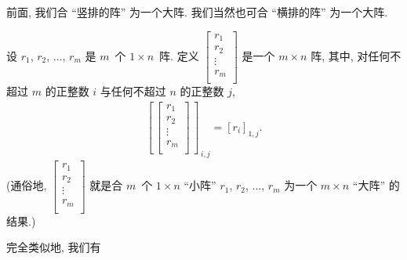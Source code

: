 前面, 我们合 ``竖排的阵'' 为一个大阵.
我们当然也可合 ``横排的阵'' 为一个大阵.

\begin{definition}
    设 \(r_1\), \(r_2\), \(\dots\), \(r_m\)
    是 \(m\)~个 \(1 \times n\)~阵.
    定义
    \(
    \begin{bmatrix}
        r_1    \\
        r_2    \\
        \vdots \\
        r_m    \\
    \end{bmatrix}
    \)
    是一个 \(m \times n\) 阵,
    其中, 对任何不超过 \(m\) 的正整数 \(i\)
    与任何不超过 \(n\) 的正整数 \(j\),
    \begin{align*}
        \left[\,\begin{bmatrix}
                        r_1    \\
                        r_2    \\
                        \vdots \\
                        r_m    \\
                    \end{bmatrix}\,\right]_{\,i,j}
        = [r_i]_{1,j}.
    \end{align*}
    (通俗地,
    \(
    \begin{bmatrix}
        r_1    \\
        r_2    \\
        \vdots \\
        r_m    \\
    \end{bmatrix}
    \)
    就是合 \(m\)~个 \(1 \times n\) ``小阵''
    \(r_1\), \(r_2\), \(\dots\), \(r_m\)
    为一个 \(m \times n\) ``大阵''
    的结果.)
\end{definition}

完全类似地, 我们有

